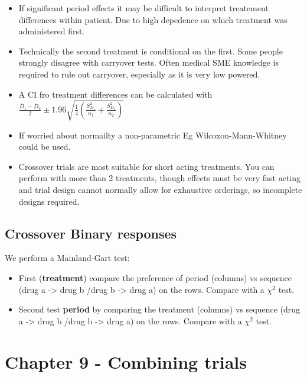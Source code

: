 \documentclass[
  letterpaper,
  DIV=11,
  numbers=noendperiod]{scrreprt}
\providecommand{\tightlist}{%
  \setlength{\itemsep}{0pt}\setlength{\parskip}{0pt}}\usepackage{longtable,booktabs,array}
\begin{document}
\begin{itemize}
\tightlist
\item
  If significant period effects it may be difficult to interpret
  treatement differences within patient. Due to high depedence on which
  treatment was administered first.
\item
  Technically the second treatment is conditional on the first. Some
  people strongly disagree with carryover tests. Often medical SME
  knowledge is required to rule out carryover, especially as it is very
  low powered.
\item
  A CI fro treatment differences can be calculated with
  \(\frac{\bar{D}_1 - \bar{D}_2}{2} \pm 1.96\sqrt{\frac{1}{4}(\frac{S_{D_1}^2}{n_1} + \frac{S_{D_2}^2}{n_2})}\)
\item
  If worried about normailty a non-parametric Eg Wilcoxon-Mann-Whitney
  could be used.
\item
  Crossover trials are most suitable for short acting treatments. You
  can perform with more than 2 treatments, though effects must be very
  fast acting and trial design cannot normally allow for exhaustive
  orderings, so incomplete designs required.
\end{itemize}

\hypertarget{crossover-binary-responses}{%
\subsection{Crossover Binary
responses}\label{crossover-binary-responses}}

We perform a Mainland-Gart test:

\begin{itemize}
\tightlist
\item
  First (\textbf{treatment}) compare the preference of period (columns)
  vs sequence (drug a -\textgreater{} drug b /drug b -\textgreater{}
  drug a) on the rows. Compare with a \(\chi^2\) test.
\item
  Second test \textbf{period} by comparing the treatment (columns) vs
  sequence (drug a -\textgreater{} drug b /drug b -\textgreater{} drug
  a) on the rows. Compare with a \(\chi^2\) test.
\end{itemize}

\hypertarget{chapter-9---combining-trials}{%
\section{Chapter 9 - Combining
trials}\label{chapter-9---combining-trials}}
\end{document}
